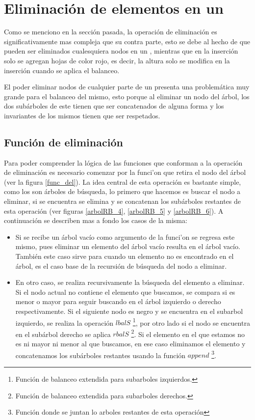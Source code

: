 \section{Eliminación de elementos en un {\arn}}

Como se menciono en la secci\'on pasada, la operaci\'on de eliminaci\'on es significativamente mas
compleja que su contra parte, esto se debe al hecho de que pueden ser eliminados cualesquiera nodos
 en un {\arn}, mientras que en la inserci\'on solo se agregan hojas de color rojo, es decir,
la altura solo se modifica en la inserción cuando se aplica el balanceo.

El poder eliminar nodos de cualquier parte de un {\arn} presenta una problemática muy grande para
el balanceo del mismo, esto porque al eliminar un nodo del \'arbol, los dos subárboles de este
tienen que ser concatenados de alguna forma y los invariantes de los mismos tienen que ser
respetados.

\subsection{Funci\'on de eliminaci\'on}

Para poder comprender la l\'ogica de las funciones que conforman a la operaci\'on de eliminaci\'on
es necesario comenzar por la funci'on que retira el nodo del \'arbol (ver la figura \ref{func_del}).
La idea central de esta operaci\'on es bastante simple, como los {\arns} son \'arboles de búsqueda,
lo primero que hacemos es buscar el nodo a eliminar, si se encuentra se elimina y se concatenan los
subárboles restantes de esta operaci\'on (ver figuras \ref{arbolRB_4}, \ref{arbolRB_5} y
\ref{arbolRB_6}). A continuaci\'on se describen mas a fondo los casos de la misma:

\begin{itemize}
    \item Si se recibe un \'arbol vacío como argumento de la funci'on se regresa este mismo, pues
    eliminar un elemento del \'arbol vacío resulta en el \'arbol vacío. También este caso sirve para
    cuando un elemento no es encontrado en el \'arbol, es el caso base de la recursi\'on de
    búsqueda del nodo a eliminar.
    \item En otro caso, se realiza recursivamente la búsqueda del elemento a eliminar. Si el nodo
    actual no contiene el elemento que buscamos, se compara si es menor o mayor para seguir
    buscando en el \'arbol izquierdo o derecho respectivamente. Si el siguiente nodo es negro y se
    encuentra en el subarbol izquierdo, se realiza la operaci\'on $lbalS$ \footnote{Funci\'on de
    balanceo extendida para subarboles izquierdos.}, por otro lado si el nodo se encuentra en el
    sub\'arbol derecho se aplica $rbalS$ \footnote{Funci\'on de balanceo extendida para subarboles
    derechos.}. Si el elemento en el que estamos no es ni mayor ni menor al que buscamos, en ese
    caso eliminamos el elemento y concatenamos los subárboles restantes usando la función $append$
    \footnote{Funci\'on donde se juntan lo arboles restantes de esta operaci\'on}.
\end{itemize}

